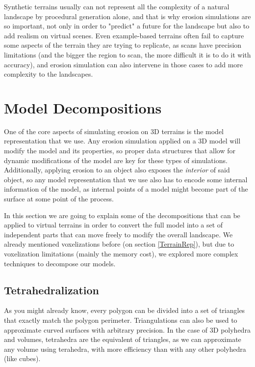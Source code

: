 Synthetic terrains usually can not represent all the complexity of a natural
landscape by procedural generation alone, and that is why erosion simulations
are so important, not only in order to "predict" a future for the landscape 
but also to add realism on virtual scenes. Even example-based terrains
often fail to capture some aspects of the terrain they are trying to replicate, 
as scans have precision limitations (and the bigger the region
to scan, the more difficult it is to do it with accuracy), and erosion 
simulation can also intervene in those cases to add more complexity to 
the landscapes.

\section{Model Decompositions}
One of the core aspects of simulating erosion on 3D terrains is 
the model representation that we use. Any erosion simulation applied
on a 3D model will modify the model and its properties, so proper
data structures that allow for dynamic modifications of the model are 
key for these types of simulations. Additionally, applying erosion to an 
object also exposes the \textit{interior} of said object, so any model
representation that we use also has to encode some internal information of
the model, as internal points of a model might become part of the surface
at some point of the process.

\vspace{10pt}

In this section we are going to explain some of the decompositions that 
can be applied to virtual terrains in order to convert the full model into 
a set of independent parts that can move freely to modify the overall 
landscape. We already mentioned voxelizations before 
(on section \ref{TerrainRep}), but due to voxelization limitations 
(mainly the memory cost), we explored more complex techniques to decompose
our models.

\subsection{Tetrahedralization}
As you might already know, every polygon can be divided into a set 
of triangles that exactly match the polygon perimeter. Triangulations
can also be used to approximate curved surfaces with arbitrary precision. 
In the case of 3D polyhedra and volumes, tetrahedra are the equivalent of triangles,
as we can approximate any volume using terahedra, with more efficiency than 
with any other polyhedra (like cubes). 


